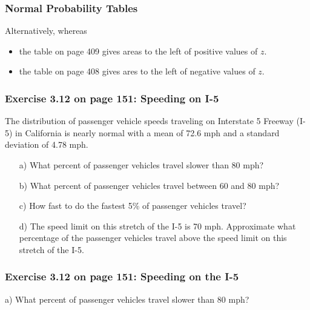 \documentclass[handout]{beamer}
\begin{document}
\begin{frame}
\frametitle{Normal Probability Tables}
Alternatively, whereas 
\begin{itemize}
\item the table on page 409 gives areas to the left of positive values of $z$.
\item the table on page 408 gives ares to the left of negative values of $z$.
\end{itemize}

\end{frame}


\begin{frame}
\frametitle{Exercise 3.12 on page 151: Speeding on I-5}
The distribution of passenger vehicle speeds traveling on Interstate 5 Freeway (I-5) in California is nearly normal with a mean of 72.6 mph and a standard deviation of 4.78 mph.

\vspace{0.25cm}

\begin{enumerate}
\item[a)] What percent of passenger vehicles travel slower than 80 mph?
\item[b)] What percent of passenger vehicles travel between 60 and 80 mph?
\item[c)] How fast to do the fastest 5\% of passenger vehicles travel?
\item[d)] The speed limit on this stretch of the I-5 is 70 mph. Approximate what percentage of
the passenger vehicles travel above the speed limit on this stretch of the I-5.
\end{enumerate}

\end{frame}


\begin{frame}
\frametitle{Exercise 3.12 on page 151: Speeding on the I-5}
a) What percent of passenger vehicles travel slower than 80 mph?

\vspace{7cm}

\end{frame}
\end{document}
